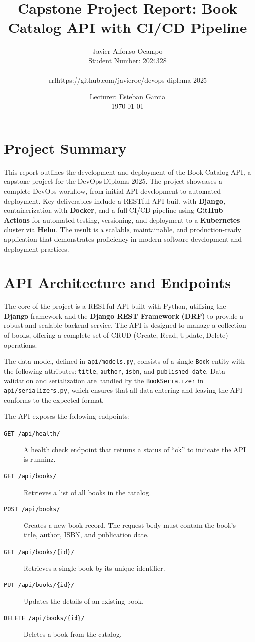 \documentclass{article}
\title{
    \vspace{2cm}
    \textbf{Capstone Project Report: Book Catalog API with CI/CD Pipeline}
    \vspace{1.5cm}
}
\author{Javier Alfonso Ocampo \\ Student Number: 2024328 \\ \\url{https://github.com/javieroc/devops-diploma-2025}}
\date{Lecturer: Esteban Garcia \\ \today}
\begin{document}
\maketitle
\thispagestyle{empty}

\newpage
\tableofcontents
\thispagestyle{empty}
\newpage
\setcounter{page}{1}

\section{Project Summary}

This report outlines the development and deployment of the Book Catalog API, a capstone project for the DevOps Diploma 2025. The project showcases a complete DevOps workflow, from initial API development to automated deployment. Key deliverables include a RESTful API built with \textbf{Django}, containerization with \textbf{Docker}, and a full CI/CD pipeline using \textbf{GitHub Actions} for automated testing, versioning, and deployment to a \textbf{Kubernetes} cluster via \textbf{Helm}. The result is a scalable, maintainable, and production-ready application that demonstrates proficiency in modern software development and deployment practices.

\section{API Architecture and Endpoints}

The core of the project is a RESTful API built with Python, utilizing the \textbf{Django} framework and the \textbf{Django REST Framework (DRF)} to provide a robust and scalable backend service. The API is designed to manage a collection of books, offering a complete set of CRUD (Create, Read, Update, Delete) operations.

The data model, defined in \texttt{api/models.py}, consists of a single \texttt{Book} entity with the following attributes: \texttt{title}, \texttt{author}, \texttt{isbn}, and \texttt{published_date}. Data validation and serialization are handled by the \texttt{BookSerializer} in \texttt{api/serializers.py}, which ensures that all data entering and leaving the API conforms to the expected format.

The API exposes the following endpoints:
\begin{description}
    \item[\texttt{GET /api/health/}] A health check endpoint that returns a status of ``ok'' to indicate the API is running.
    \item[\texttt{GET /api/books/}] Retrieves a list of all books in the catalog.
    \item[\texttt{POST /api/books/}] Creates a new book record. The request body must contain the book's title, author, ISBN, and publication date.
    \item[\texttt{GET /api/books/\{id\}/}] Retrieves a single book by its unique identifier.
    \item[\texttt{PUT /api/books/\{id\}/}] Updates the details of an existing book.
    \item[\texttt{DELETE /api/books/\{id\}/}] Deletes a book from the catalog.
\end{description}
\end{document}
